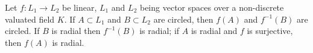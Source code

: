 Let $f: L_1 \to L_2$ be linear, $L_1$ and $L_2$ being vector spaces over a non-discrete valuated field $K$. If $A \subset L_1$ and $B \subset L_2$ are circled, then $f(A)$ and $f^{-1}(B)$ are circled. If $B$ is radial then $f^{-1}(B)$ is radial; if $A$ is radial and $f$ is surjective, then $f(A)$ is radial.
